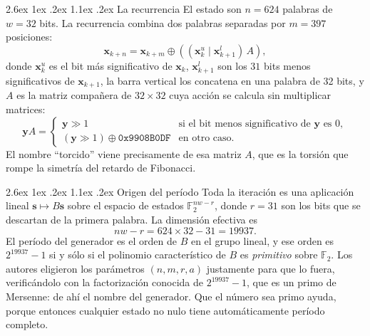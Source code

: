 \documentclass[11pt,letterpaper]{article}
\makeatletter
\renewcommand\paragraph{\@startsection{paragraph}{4}{\z@}%
  {2.6ex \@plus 1ex \@minus .2ex}%
  {1.1ex \@plus .2ex}%
  {\normalfont\normalsize\bfseries}}
\makeatother
\begin{document}
\paragraph{La recurrencia} El estado son $n = 624$ palabras de $w = 32$
bits. La recurrencia combina dos palabras separadas por $m = 397$ posiciones:
\begin{equation}
\mathbf{x}_{k+n} = \mathbf{x}_{k+m} \oplus
\left( (\mathbf{x}_k^{u} \mid \mathbf{x}_{k+1}^{l})\, A \right),
\label{eq:mt}
\end{equation}
donde $\mathbf{x}_k^{u}$ es el bit más significativo de $\mathbf{x}_k$,
$\mathbf{x}_{k+1}^{l}$ son los $31$ bits menos significativos de
$\mathbf{x}_{k+1}$, la barra vertical los concatena en una palabra de 32
bits, y $A$ es la matriz compañera de $32\times32$ cuya acción se calcula sin
multiplicar matrices:
\begin{equation}
\mathbf{y} A =
\begin{cases}
\mathbf{y} \gg 1 & \text{si el bit menos significativo de } \mathbf{y}
\text{ es } 0,\\[2pt]
(\mathbf{y} \gg 1) \oplus \texttt{0x9908B0DF} & \text{en otro caso.}
\end{cases}
\end{equation}
El nombre ``torcido'' viene precisamente de esa matriz $A$, que es la
torsión que rompe la simetría del retardo de Fibonacci.

\paragraph{Origen del período} Toda la iteración es una aplicación
lineal $\mathbf{s} \mapsto B\mathbf{s}$ sobre el espacio de estados
$\mathbb{F}_2^{nw - r}$, donde $r = 31$ son los bits que se descartan de la
primera palabra. La dimensión efectiva es
\begin{equation}
nw - r = 624 \times 32 - 31 = 19937.
\end{equation}
El período del generador es el orden de $B$ en el grupo lineal, y ese orden
es $2^{19937}-1$ si y sólo si el polinomio característico de $B$ es
\emph{primitivo} sobre $\mathbb{F}_2$. Los autores eligieron los parámetros
$(n, m, r, a)$ justamente para que lo fuera, verificándolo con la
factorización conocida de $2^{19937}-1$, que es un primo de Mersenne: de ahí
el nombre del generador. Que el número sea primo ayuda, porque entonces
cualquier estado no nulo tiene automáticamente período completo.
\end{document}
